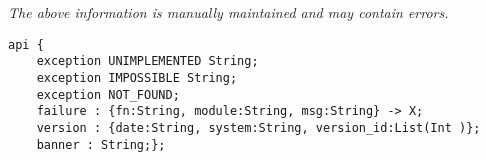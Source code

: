 \label{api:Lib\_Base}

{\tiny \it The above information is manually maintained and may contain errors.}
\begin{verbatim}
api {
    exception UNIMPLEMENTED String;
    exception IMPOSSIBLE String;
    exception NOT_FOUND;
    failure : {fn:String, module:String, msg:String} -> X;
    version : {date:String, system:String, version_id:List(Int )};
    banner : String;};
\end{verbatim}
